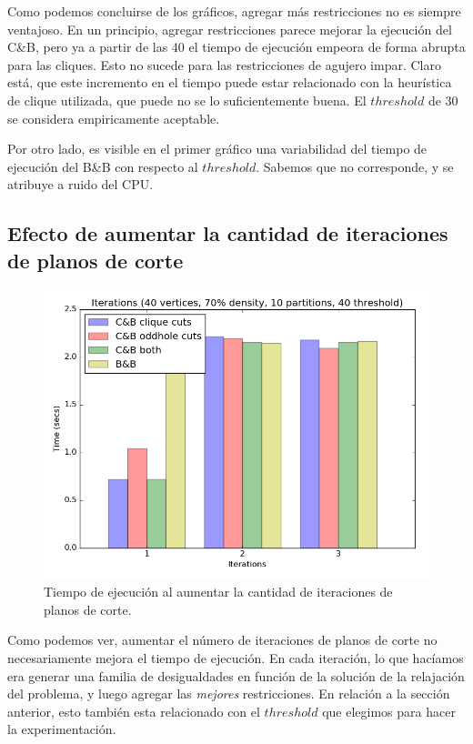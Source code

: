 Como podemos concluirse de los gráficos, agregar más restricciones no es siempre ventajoso. En un principio, agregar restricciones parece mejorar la ejecución del C\&B, pero ya a partir de las 40 el tiempo de ejecución empeora de forma abrupta para las cliques. Esto no sucede para las restricciones de agujero impar. Claro está, que este incremento en el tiempo puede estar relacionado con la heurística de clique utilizada, que puede no se lo suficientemente buena. El $threshold$ de 30 se considera empiricamente aceptable.

Por otro lado, es visible en el primer gráfico una variabilidad del tiempo de ejecución del B\&B con respecto al $threshold$. Sabemos que no corresponde, y se atribuye a ruido del CPU.

\subsection{Efecto de aumentar la cantidad de iteraciones de planos de corte}

\begin{figure}[h]
\centering
\includegraphics[scale=0.5]{img/7-iterations_v40_p10_l40_t1_b0.png}
\caption{Tiempo de ejecución al aumentar la cantidad de iteraciones de planos de corte.}
\end{figure}

Como podemos ver, aumentar el número de iteraciones de planos de corte no necesariamente mejora el tiempo de ejecución. En cada iteración, lo que hacíamos era generar una familia de desigualdades en función de la solución de la relajación del problema, y luego agregar las \textit{mejores} restricciones. En relación a la sección anterior, esto también esta relacionado con el $threshold$ que elegimos para hacer la experimentación.

